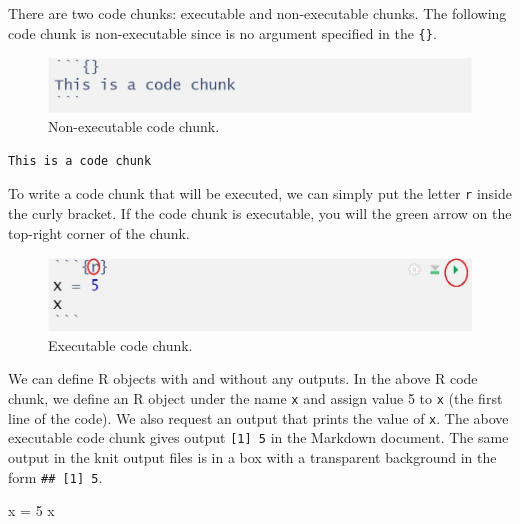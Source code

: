 \documentclass[
]{book}
\newenvironment{Shaded}{\begin{snugshade}}{\end{snugshade}}
\newcommand{\DecValTok}[1]{\textcolor[rgb]{0.00,0.00,0.81}{#1}}
\newcommand{\NormalTok}[1]{#1}
\newcommand{\OtherTok}[1]{\textcolor[rgb]{0.56,0.35,0.01}{#1}}
\begin{document}
There are two code chunks: executable and non-executable chunks. The following code chunk is non-executable since is no argument specified in the \texttt{\{\}}.

\begin{figure}

{\centering \includegraphics[width=12.54in]{img00/Non-executable-code-chunk} 

}

\caption{Non-executable code chunk.}\label{fig:unnamed-chunk-5}
\end{figure}

\begin{verbatim}
This is a code chunk
\end{verbatim}

To write a code chunk that will be executed, we can simply put the letter \texttt{r} inside the curly bracket. If the code chunk is executable, you will the green arrow on the top-right corner of the chunk.

\begin{figure}

{\centering \includegraphics[width=0.8\linewidth]{img00/Executable-code-chunk} 

}

\caption{Executable code chunk.}\label{fig:unnamed-chunk-6}
\end{figure}

We can define R objects with and without any outputs. In the above R code chunk, we define an R object under the name \texttt{x} and assign value 5 to \texttt{x} (the first line of the code). We also request an output that prints the value of \texttt{x}. The above executable code chunk gives output \texttt{{[}1{]}\ 5} in the Markdown document. The same output in the knit output files is in a box with a transparent background in the form \texttt{\#\#\ {[}1{]}\ 5}.

\begin{Shaded}
\begin{Highlighting}[]
\NormalTok{x }\OtherTok{=} \DecValTok{5}
\NormalTok{x}
\end{Highlighting}
\end{Shaded}
\end{document}
